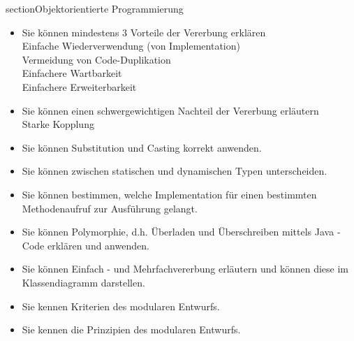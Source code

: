 section{Objektorientierte Programmierung}
\begin{itemize}
  \item Sie können mindestens 3 Vorteile der Vererbung erklären\\
        Einfache Wiederverwendung (von Implementation) \\
        Vermeidung von Code-Duplikation \\
        Einfachere Wartbarkeit \\
        Einfachere Erweiterbarkeit
  \item Sie können einen schwergewichtigen Nachteil der Vererbung erläutern\\
        Starke Kopplung
  \item Sie können Substitution und Casting korrekt anwenden. \\

  \item Sie können zwischen statischen und dynamischen Typen unterscheiden. \\

  \item Sie können bestimmen, welche Implementation für einen bestimmten Methodenaufruf zur Ausführung gelangt. \\

  \item Sie können Polymorphie, d.h. Überladen und Überschreiben mittels Java - Code erklären und anwenden. \\

  \item Sie können Einfach - und Mehrfachvererbung erläutern und können diese im Klassendiagramm darstellen. \\

  \item Sie kennen Kriterien des modularen Entwurfs. \\

  \item Sie kennen die Prinzipien des modularen Entwurfs. \\

\end{itemize}

